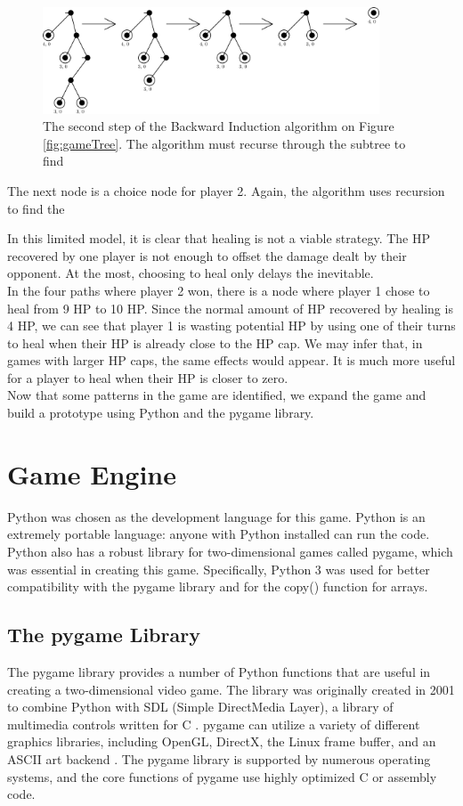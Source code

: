 \begin{figure}
  \centering
  \includegraphics[width=10cm]{figures/Backwards2.png}
  \caption{The second step of the Backward Induction algorithm on Figure \ref{fig:gameTree}. The algorithm must recurse through the subtree to find }
\end{figure}
  The next node is a choice node for player 2. Again, the algorithm uses recursion to find the 

In this limited model, it is clear that healing is not a viable strategy. The HP recovered by one player is not enough to offset the damage dealt by their opponent. At the most, choosing to heal only delays the inevitable.\\

In the four paths where player 2 won, there is a node where player 1 chose to heal from 9 HP to 10 HP. Since the normal amount of HP recovered by healing is 4 HP, we can see that player 1 is wasting potential HP by using one of their turns to heal when their HP is already close to the HP cap. We may infer that, in games with larger HP caps, the same effects would appear. It is much more useful for a player to heal when their HP is closer to zero.\\

Now that some patterns in the game are identified, we expand the game and build a prototype using Python and the pygame library.

\section{Game Engine}
Python was chosen as the development language for this game. Python is an extremely portable language: anyone with Python installed can run the code. Python also has a robust library for two-dimensional games called pygame, which was essential in creating this game. Specifically, Python 3 was used for better compatibility with the pygame library and for the copy() function for arrays.

\subsection{The pygame Library}
The pygame library provides a number of Python functions that are useful in creating a two-dimensional video game. The library was originally created in 2001 to combine Python with SDL (Simple DirectMedia Layer), a library of multimedia controls written for C \cite{shinners}. pygame can utilize a variety of different graphics libraries, including OpenGL, DirectX, the Linux frame buffer, and an ASCII art backend \cite{shinners}. The pygame library is supported by numerous operating systems, and the core functions of pygame use highly optimized C or assembly code.\\

